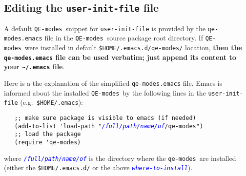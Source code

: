 \documentclass[12pt,a4paper]{article}
\def\QEmodes{\texttt{QE-modes}}
\def\qemodes{\texttt{qe-modes}}
\def\var#1{\textcolor{Blue}{\texttt{\textit{#1}}}}
\begin{document}
\subsection{Editing the \texttt{user-init-file} file}

A default \QEmodes\ snippet for \texttt{user-init-file} is provided by
the \texttt{qe-modes.emacs} file in the \QEmodes\ source package root
directory. If \QEmodes\ were installed in default
  \verb+$HOME/.emacs.d/qe-modes/+ location, {\bf then the
  \texttt{qe-modes.emacs} file can be used verbatim; just append its
  content to your \verb+~/.emacs+ file}.

Here is a the explanation of the simplified \texttt{qe-modes.emacs}
file.  Emacs is informed about the installed \QEmodes\ by the
following lines in the \verb+user-init-file+ (e.g.\
\verb+$HOME/.emacs+):
\begin{flushleft}
{\color{red}
\verb+   ;; make sure package is visible to emacs (if needed)+}\\
\verb+   (add-to-list 'load-path "+\var{/full/path/name/of}\verb+/qe-modes")+\\[1em]
{\color{red}
\verb+   ;; load the package+}\\
\verb+   (require 'qe-modes)+
\end{flushleft}
where \var{/full/path/name/of} is the directory where the \qemodes\
are installed (either the \texttt{\$HOME/.emacs.d/} or the above
\var{where-to-install}).
\end{document}
